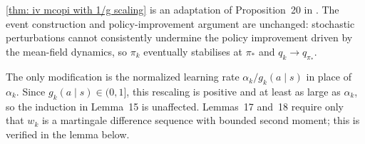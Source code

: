 \autoref{thm: iv mcopi with 1/g scaling} is an adaptation of Proposition~20 in \cite{Oliviers2026ConvergenceUpdates}. The event construction and policy-improvement argument are unchanged: 
stochastic perturbations cannot consistently undermine the policy improvement driven by the mean-field dynamics,
so $\pi_k$ eventually stabilises at $\pi_*$ and $q_k \to q_{\pi_*}$.


The only modification is the normalized learning rate $\alpha_k/g_k(a\mid s)$ in place of $\alpha_k$. Since $g_k(a\mid s) \in (0,1]$, this rescaling is positive and at least as large as $\alpha_k$, so the induction in Lemma~15 is unaffected. Lemmas~17 and~18 require only that $w_k$ is a martingale difference sequence with bounded second moment; this is verified in the lemma below.






